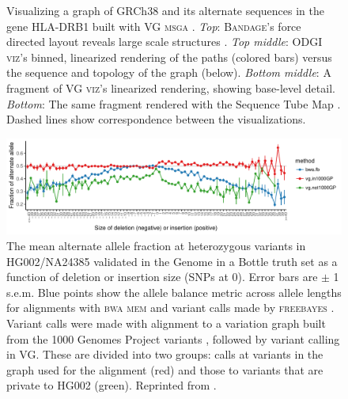 \begin{figure}[p]
\begin{minipage}[c]{0.3\textwidth}
{      Visualizing a graph of GRCh38 and its alternate sequences in the gene HLA-DRB1 built with \textsc{VG msga} \cite{Garrison_2019}.
      \emph{Top}: \textsc{Bandage}'s force directed layout reveals large scale structures \cite{Wick_2015}.
      \emph{Top middle}: \textsc{ODGI viz}'s binned, linearized rendering of the paths (colored bars) versus the sequence and topology of the graph (below).
      \emph{Bottom middle}: A fragment of \textsc{VG viz}'s linearized rendering, showing base-level detail.
      \emph{Bottom}: The same fragment rendered with the Sequence Tube Map \cite{Beyer_2019}.
      Dashed lines show correspondence between the visualizations.
    } \label{fig:visualization}
  \end{minipage}
\end{figure}

\begin{figure}[p]
\centering
\includegraphics[width=1.0\textwidth]{figures/HG002_wg_pan_ref_bwa_true_hets_allele_balance_tsv_gz_3.pdf}
\caption[Indel allele balance in HG002]{The mean alternate allele fraction at heterozygous variants in HG002/NA24385 validated in the Genome in a Bottle truth set \cite{zook2014integrating} as a function of deletion or insertion size (SNPs at 0).
  Error bars are $\pm$ 1 s.e.m.
  Blue points show the allele balance metric across allele lengths for alignments with \textsc{bwa mem} \cite{Li_2013} and variant calls made by \textsc{freebayes} \cite{garrison2012haplotype}.
  Variant calls were made with alignment to a variation graph built from the 1000 Genomes Project variants \cite{1000_2015}, followed by variant calling in \textsc{VG}.
  These are divided into two groups: calls at variants in the graph used for the alignment (red) and those to variants that are private to HG002 (green).
  Reprinted from \cite{Garrison_2018}.}
\label{fig:allelebalance}
\end{figure}


